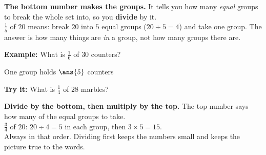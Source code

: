 \documentclass[12pt]{article}
\begin{document}


\begin{formulabox}
\textbf{The bottom number makes the groups.} It tells you how many
\emph{equal} groups to break the whole set into, so you \textbf{divide} by
it.\\[3pt]
$\frac{1}{5}$ of $20$ means: break $20$ into $5$ equal groups
($20 \div 5 = 4$) and take one group. The answer is how many things are
\emph{in} a group, not how many groups there are.
\end{formulabox}

\begin{examplebox}
\textbf{Example:} \quad What is $\frac{1}{6}$ of $30$ counters?
\begin{center}
\end{center}

One group holds $\ans{5}$ counters
\end{examplebox}

\begin{tryitbox}
\textbf{Try it:} \quad What is $\frac{1}{4}$ of $28$ marbles?\\[2pt]
\end{tryitbox}


\begin{formulabox}
\textbf{Divide by the bottom, then multiply by the top.} The top number says
how many of the equal groups to take.\\[3pt]
$\frac{3}{4}$ of $20$: \quad $20 \div 4 = 5$ in each group, then
$3 \times 5 = 15$.\\[2pt]
Always in that order. Dividing first keeps the numbers small and keeps the
picture true to the words.
\end{formulabox}
\end{document}
